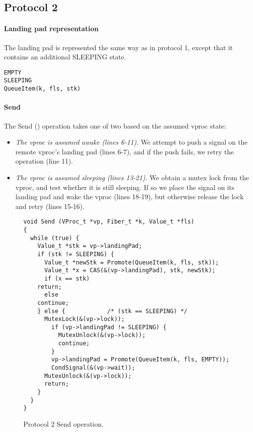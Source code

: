 \documentclass[11pt]{article}
\begin{document}
\subsection{Protocol 2}\label{sec:protocol2}

\paragraph{Landing pad representation}
The landing pad is represented the same way as in protocol 1, except that it 
contains an additional SLEEPING state.
\lstset{language=C}
\lstset{commentstyle=\textit}
\begin{lstlisting}
EMPTY
SLEEPING
QueueItem(k, fls, stk)
\end{lstlisting}

\paragraph{Send}
The Send () operation takes one of two based on the assumed
vproc state:
\begin{itemize}
\item \emph{The vproc is assumed awake (lines 6-11).} We attempt to push a signal on the remote vproc's landing pad (lines 6-7), and
if the push fails, we retry the operation (line 11).
\item \emph{The vproc is assumed sleeping (lines 13-21).} We obtain a mutex lock from the vproc, and test
whether it is still sleeping.
If so we place the signal on its landing pad and wake the vproc (lines 18-19), 
but otherwise release the lock and retry (lines 15-16).
\end{itemize}

\begin{figure}
\lstset{language=C}
\lstset{commentstyle=\textit}
\lstset{numbers=left}
\begin{lstlisting}
void Send (VProc_t *vp, Fiber_t *k, Value_t *fls)
{
  while (true) {
    Value_t *stk = vp->landingPad;
    if (stk != SLEEPING) {
      Value_t *newStk = Promote(QueueItem(k, fls, stk));
      Value_t *x = CAS(&(vp->landingPad), stk, newStk);
      if (x == stk)
	return;
      else
	continue;
    } else {            /* (stk == SLEEPING) */
      MutexLock(&(vp->lock));
        if (vp->landingPad != SLEEPING) {
          MutexUnlock(&(vp->lock));
          continue;
        }
        vp->landingPad = Promote(QueueItem(k, fls, EMPTY));
        CondSignal(&(vp->wait));
      MutexUnlock(&(vp->lock));
      return;
    }
  }
}
\end{lstlisting}
\caption{Protocol 2 Send operation.}\label{fig:protocol2-send}
\end{figure}
\end{document}

